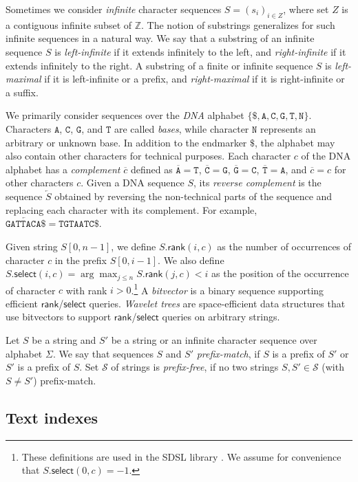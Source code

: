 \documentclass[a4paper,UKenglish]{lipics-v2016}
\newcommand{\set}[1]{\ensuremath{\{ #1 \}}}
\newcommand{\dnaseq}[1]{\ensuremath{\mathtt{#1}}}
\newcommand{\baseA}{\dnaseq{A}}
\newcommand{\baseC}{\dnaseq{C}}
\newcommand{\baseG}{\dnaseq{G}}
\newcommand{\baseT}{\dnaseq{T}}
\newcommand{\baseN}{\dnaseq{N}}
\newcommand{\dnacomp}[1]{\ensuremath{\overline{#1}}}
\newcommand{\revcomp}[1]{\ensuremath{\overleftarrow{#1}}}
\newcommand{\rank}{\ensuremath{\mathsf{rank}}}
\newcommand{\select}{\ensuremath{\mathsf{select}}}
\begin{document}
Sometimes we consider \emph{infinite} character sequences $S = (s_{i})_{i \in Z}$, where set $Z$ is a contiguous infinite subset of $\mathbb{Z}$. The notion of substrings generalizes for such infinite sequences in a natural way. We say that a substring of an infinite sequence $S$ is \emph{left-infinite} if it extends infinitely to the left, and \emph{right-infinite} if it extends infinitely to the right. A substring of a finite or infinite sequence $S$ is \emph{left-maximal} if it is left-infinite or a prefix, and \emph{right-maximal} if it is right-infinite or a suffix.

We primarily consider sequences over the \emph{DNA} alphabet $\set{\$, \baseA, \baseC, \baseG, \baseT, \baseN}$. Characters $\baseA$, $\baseC$, $\baseG$, and $\baseT$ are called \emph{bases}, while character $\baseN$ represents an arbitrary or unknown base. In addition to the endmarker $\$$, the alphabet may also contain other characters for technical purposes. Each character $c$ of the DNA alphabet has a \emph{complement} $\dnacomp{c}$ defined as $\dnacomp{\baseA} = \baseT$, $\dnacomp{\baseC} = \baseG$, $\dnacomp{\baseG} = \baseC$, $\dnacomp{\baseT} = \baseA$, and $\dnacomp{c} = c$ for other characters $c$. Given a DNA sequence $S$, its \emph{reverse complement} is the sequence $\revcomp{S}$ obtained by reversing the non-technical parts of the sequence and replacing each character with its complement. For example, $\revcomp{\dnaseq{GATTACA}\$} = \dnaseq{TGTAATC}\$$.

Given string $S[0, n-1]$, we define $S.\rank(i, c)$ as the number of occurrences of character $c$ in the prefix $S[0, i-1]$. We also define $S.\select(i, c) = \arg \max_{j \le n} S.\rank(j, c) < i$ as the position of the occurrence of character $c$ with rank $i > 0$.\footnote{These definitions are used in the SDSL library \cite{Gog2014b}. We assume for convenience that $S.\select(0, c) = -1$.} A \emph{bitvector} is a binary sequence supporting efficient $\rank$/$\select$ queries. \emph{Wavelet trees} \cite{Grossi2003} are space-efficient data structures that use bitvectors to support $\rank$/$\select$ queries on arbitrary strings.

Let $S$ be a string and $S'$ be a string or an infinite character sequence over alphabet $\Sigma$. We say that sequences $S$ and $S'$ \emph{prefix-match}, if $S$ is a prefix of $S'$ or $S'$ is a prefix of $S$. Set $\mathcal{S}$ of strings is \emph{prefix-free}, if no two strings $S, S' \in \mathcal{S}$ (with $S \ne S'$) prefix-match.

\subsection{Text indexes}
\end{document}
